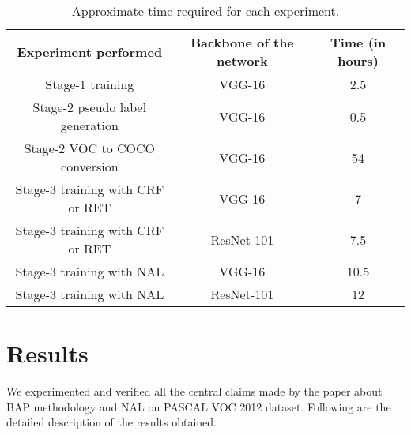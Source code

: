 \begin{table}[h!]
\begin{center}
\begin{tabular}{ccc} \toprule\toprule
Experiment performed              & Backbone of the network     &Time (in hours)\\ \midrule
Stage-1 training                &VGG-16                         &2.5 \\ 
Stage-2 pseudo label generation                &VGG-16          &0.5 \\ 
Stage-2 VOC to COCO conversion    &VGG-16                       &54\\  
Stage-3 training with CRF or RET         &VGG-16                &7 \\ 
Stage-3 training with CRF or RET         &ResNet-101            &7.5 \\ 
Stage-3 training with NAL             &VGG-16                   &10.5  \\ 
Stage-3 training with NAL             &ResNet-101               &12  \\ \bottomrule
\end{tabular}
\vspace{1mm}
\caption{Approximate time required for each experiment.}
\label{tab:time}
\end{center}
\end{table}





\section{Results}
\label{sec:results}

We experimented and verified all the central claims made by the paper about BAP methodology and NAL on PASCAL VOC 2012 dataset. Following are the detailed description of the results obtained.



